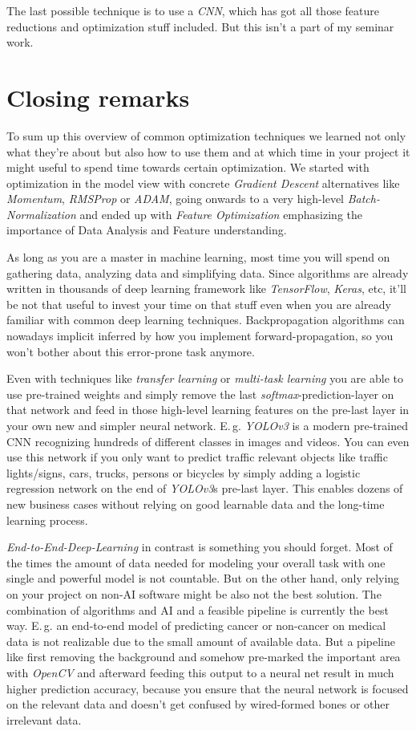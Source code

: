 \documentclass[dvipsnames,twocolumn]{scrartcl}
\begin{document}
	The last possible technique is to use a \emph{CNN}, which has got all those feature reductions and optimization stuff included. But this isn't a part of my seminar work.
	
	\section{Closing remarks}
	
	To sum up this overview of common optimization techniques we learned not only what they're about but also how to use them and at which time in your project it might useful to spend time towards certain optimization. We started with optimization in the model view with concrete \emph{Gradient Descent} alternatives like \emph{Momentum}, \emph{RMSProp} or \emph{ADAM}, going onwards to a very high-level \emph{Batch-Normalization} and ended up with \emph{Feature Optimization} emphasizing the importance of Data Analysis and Feature understanding.
	
	As long as you are a master in machine learning, most time you will spend on gathering data, analyzing data and simplifying data. Since algorithms are already written in thousands of deep learning framework like \emph{TensorFlow}, \emph{Keras}, etc, it'll be not that useful to invest your time on that stuff even when you are already familiar with common deep learning techniques. Backpropagation algorithms can nowadays implicit inferred by how you implement forward-propagation, so you won't bother about this error-prone task anymore.
	
	Even with techniques like \emph{transfer learning} or \emph{multi-task learning} you are able to use pre-trained weights and simply remove the last \emph{softmax}-prediction-layer on that network and feed in those high-level learning features on the pre-last layer in your own new and simpler neural network. E.\,g. \emph{YOLOv3} is a modern pre-trained CNN recognizing hundreds of different classes in images and videos. You can even use this network if you only want to predict traffic relevant objects like traffic lights/signs, cars, trucks, persons or bicycles by simply adding a logistic regression network on the end of \emph{YOLOv3}s pre-last layer. This enables dozens of new business cases without relying on good learnable data and the long-time learning process.
	
	\emph{End-to-End-Deep-Learning} in contrast is something you should forget. Most of the times the amount of data needed for modeling your overall task with one single and powerful model is not countable. But on the other hand, only relying on your project on non-AI software might be also not the best solution. The combination of algorithms and AI and a feasible pipeline is currently the best way. E.\,g. an end-to-end model of predicting cancer or non-cancer on medical data is not realizable due to the small amount of available data. But a pipeline like first removing the background and somehow pre-marked the important area with \emph{OpenCV} and afterward feeding this output to a neural net result in much higher prediction accuracy, because you ensure that the neural network is focused on the relevant data and doesn't get confused by wired-formed bones or other irrelevant data.
	
	
	
	
	
	\listoffigures
	
\end{document}
